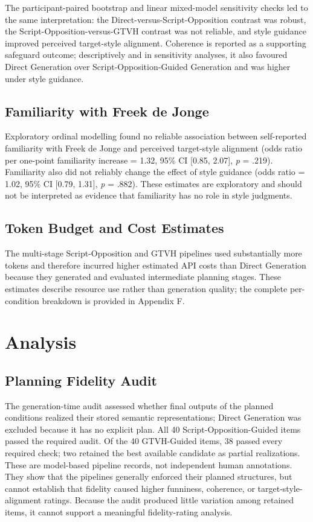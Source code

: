 \documentclass[11pt]{article}
\begin{document}
The participant-paired bootstrap and linear mixed-model sensitivity checks led to the same interpretation: the Direct-versus-Script-Opposition contrast was robust, the Script-Opposition-versus-GTVH contrast was not reliable, and style guidance improved perceived target-style alignment. Coherence is reported as a supporting safeguard outcome; descriptively and in sensitivity analyses, it also favoured Direct Generation over Script-Opposition-Guided Generation and was higher under style guidance.

\subsection{Familiarity with Freek de Jonge}\label{familiarity-with-freek-de-jonge}

Exploratory ordinal modelling found no reliable association between self-reported familiarity with Freek de Jonge and perceived target-style alignment (odds ratio per one-point familiarity increase = 1.32, 95\% CI {[}0.85, 2.07{]}, \emph{p} = .219). Familiarity also did not reliably change the effect of style guidance (odds ratio = 1.02, 95\% CI {[}0.79, 1.31{]}, \emph{p} = .882). These estimates are exploratory and should not be interpreted as evidence that familiarity has no role in style judgments.

\subsection{Token Budget and Cost Estimates}\label{token-budget-and-cost-estimates}

The multi-stage Script-Opposition and GTVH pipelines used substantially more tokens and therefore incurred higher estimated API costs than Direct Generation because they generated and evaluated intermediate planning stages. These estimates describe resource use rather than generation quality; the complete per-condition breakdown is provided in Appendix F.

\section{Analysis}\label{analysis}

\subsection{Planning Fidelity Audit}\label{planning-fidelity-audit}

The generation-time audit assessed whether final outputs of the planned conditions realized their stored semantic representations; Direct Generation was excluded because it has no explicit plan. All 40 Script-Opposition-Guided items passed the required audit. Of the 40 GTVH-Guided items, 38 passed every required check; two retained the best available candidate as partial realizations. These are model-based pipeline records, not independent human annotations. They show that the pipelines generally enforced their planned structures, but cannot establish that fidelity caused higher funniness, coherence, or target-style-alignment ratings. Because the audit produced little variation among retained items, it cannot support a meaningful fidelity-rating analysis.
\end{document}
